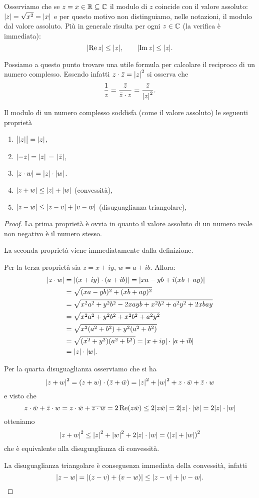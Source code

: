 Osserviamo che se $z = x \in \mathbb R \subseteq \mathbb C$ il modulo di $z$ coincide
con il valore assoluto: ${\left|z\right|} = \sqrt{x^2} = {\left|x\right|}$ e per questo
motivo non distinguiamo, nelle notazioni, il modulo dal valore assoluto.
Più in generale risulta per ogni $z\in \mathbb C$ (la verifica è immediata):
\[
  {\left|\operatorname{Re} z\right|} \le {\left|z\right|}, \qquad
  {\left|\operatorname{Im}z\right|} \le {\left|z\right|}.
\]

Possiamo a questo punto trovare una utile formula per calcolare
il reciproco di un numero complesso. Essendo infatti
$z\cdot \bar z = {\left|z\right|}^2$ si osserva che
\[
  \frac{1}{z}
  = \frac{\bar z}{ \bar z \cdot z}
  = \frac{\bar z}{{\left|z\right|}^2}.
\]

\begin{theorem}
Il modulo di un numero complesso soddisfa (come il valore assoluto)
le seguenti proprietà
\begin{enumerate}
\item $\big\lvert{\left|z\right|}\big\rvert = {\left|z\right|}$,
\item ${\left|-z\right|} = {\left|z\right|}$ = ${\left|\bar z\right|}$,
\item ${\left|z\cdot w\right|} = {\left|z\right|}\cdot{\left|w\right|}$.
\item ${\left|z+w\right|} \le {\left|z\right|}+{\left|w\right|}$ (convessità),
\item ${\left|z-w\right|} \le {\left|z-v\right|} + {\left|v-w\right|}$ (disuguaglianza triangolare),
\end{enumerate}
\end{theorem}
%
\begin{proof}
La prima proprietà è ovvia in quanto il valore assoluto di un numero reale
non negativo è il numero stesso.

La seconda proprietà viene immediatamente dalla definizione.

Per la terza proprietà sia $z=x+iy$, $w=a+ib$.
Allora:
\begin{align*}
{\left|z\cdot w\right|}
&= {\left|(x+iy)\cdot(a+ib)\right|}
={\left|xa - y b+ i(xb + ay)\right|} \\
&= \sqrt{(xa-yb)^2 + (xb+ay)^2}\\
&=\sqrt{x^2 a^2 + y^2b^2 - 2xayb + x^2b^2+a^2y^2+2xbay} \\
&=\sqrt{x^2 a^2 + y^2 b^2 + x^2 b^2 + a^2 y^2}\\
&=\sqrt{x^2(a^2+b^2) + y^2(a^2+b^2)}\\
&=\sqrt{(x^2+y^2)(a^2+b^2)}
={\left|x+iy\right|} \cdot {\left|a+ib\right|}\\
&={\left|z\right|}\cdot{\left|w\right|}.
\end{align*}

Per la quarta disuguaglianza osserviamo che si ha
\[
  {\left|z+w\right|}^2 = (z+w)\cdot(\bar z + \bar w)
  = {\left|z\right|}^2 + {\left|w\right|}^2 + z\cdot \bar w + \bar z \cdot w
\]
e visto che
\[
  z\cdot \bar w + \bar z \cdot w
  = z \cdot \bar w + \overline{z \cdot w}
  = 2 \operatorname{Re}(z\bar w)
  \le 2 {\left|z\bar w\right|}
  = 2 {\left|z\right|}\cdot{\left|\bar w\right|}
  = 2 {\left|z\right|}\cdot{\left|w\right|}
\]
otteniamo
\[
 {\left|z+w\right|}^2 \le {\left|z\right|}^2+{\left|w\right|}^2 + 2 {\left|z\right|}\cdot{\left|w\right|}
 ={\left( {\left|z\right|} + {\left|w\right|} \right)}^2
\]
che è equivalente alla disuguaglianza di convessità.

La disuguaglianza triangolare è conseguenza immediata della convessità, infatti
\[
  {\left|z-w\right|} = {\left|(z-v) + (v-w)\right|}
  \le {\left|z-v\right|} + {\left|v-w\right|}.
\]
\end{proof}


